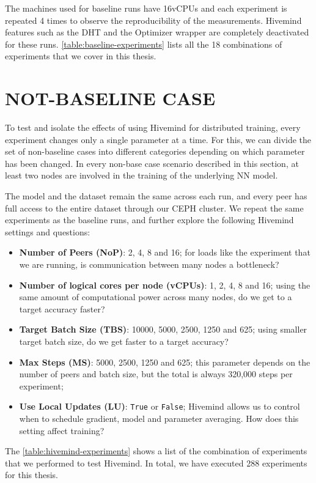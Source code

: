 The machines used for baseline runs have 16vCPUs and each experiment is repeated 4 times to observe the reproducibility of the measurements.
Hivemind features such as the DHT and the Optimizer wrapper are completely deactivated for these runs.
\autoref{table:baseline-experiments} lists all the 18 combinations of experiments that we cover in this thesis.

\section{NOT-BASELINE CASE}\label{sec:not-baseline-case}

To test and isolate the effects of using Hivemind for distributed training, every experiment changes only a single parameter at a time.
For this, we can divide the set of non-baseline cases into different categories depending on which parameter has been changed.
In every non-base case scenario described in this section, at least two nodes are involved in the training of the underlying NN model.

The model and the dataset remain the same across each run, and every peer has full access to the entire dataset through our CEPH cluster.
We repeat the same experiments as the baseline runs, and further explore the following Hivemind settings and questions:
\begin{itemize}
    \item \textbf{Number of Peers (NoP)}: 2, 4, 8 and 16; for loads like the experiment that we are running, is communication between many nodes a bottleneck?
    \item \textbf{Number of logical cores per node (vCPUs)}: 1, 2, 4, 8 and 16; using the same amount of computational power across many nodes, do we get to a target accuracy faster?
    \item \textbf{Target Batch Size (TBS)}: 10000, 5000, 2500, 1250 and 625; using smaller target batch size, do we get faster to a target accuracy?
    \item \textbf{Max Steps (MS)}: 5000, 2500, 1250 and 625; this parameter depends on the number of peers and batch size, but the total is always 320,000 steps per experiment;
    \item \textbf{Use Local Updates (LU)}: \texttt{True} or \texttt{False}; Hivemind allows us to control when to schedule gradient, model and parameter averaging. How does this setting affect training?
\end{itemize}

The \autoref{table:hivemind-experiments} shows a list of the combination of experiments that we performed to test Hivemind.
In total, we have executed 288 experiments for this thesis.

